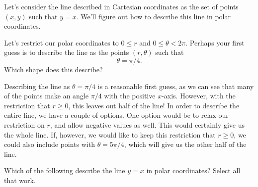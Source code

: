 \documentclass{ximera}
\begin{document}
\begin{example}
Let's consider the line described in Cartesian coordinates as the set of points $(x,y)$ such that $y=x$. We'll figure out how to describe this line in polar coordinates.

\begin{image}
\end{image}

Let's restrict our polar coordinates to $0\leq r$ and $0\leq \theta <2\pi$. Perhaps your first guess is to describe the line as the points $(r,\theta)$ such that
\[
\theta = \pi/4 .
\]
Which shape does this describe?
\begin{multipleChoice}
\end{multipleChoice}

Describing the line as $\theta = \pi/4$ is a reasonable first guess, as we can see that many of the points make an angle $\pi/4$ with the positive $x$-axis. However, with the restriction that $r\geq 0$, this leaves out half of the line! In order to describe the entire line, we have a couple of options. One option would be to relax our restriction on $r$, and allow negative values as well. This would certainly give us the whole line. If, however, we would like to keep this restriction that $r\geq 0$, we could also include points with $\theta = 5\pi/4$, which will give us the other half of the line.

Which of the following describe the line $y=x$ in polar coordinates? Select all that work.
\begin{selectAll}
\end{selectAll}

\end{example}
\end{document}
